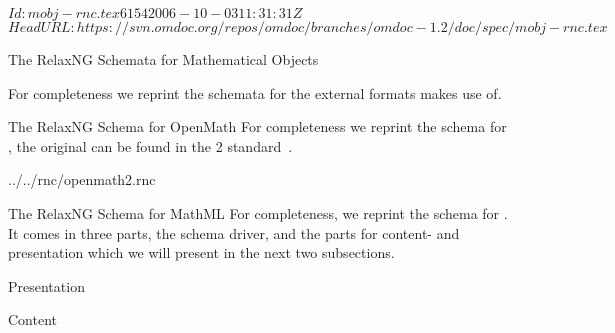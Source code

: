 \svnInfo $Id: mobj-rnc.tex 6154 2006-10-03 11:31:31Z  $
\svnKeyword $HeadURL: https://svn.omdoc.org/repos/omdoc/branches/omdoc-1.2/doc/spec/mobj-rnc.tex $

\begin{tchapter}[id=mobj-rnc]{The RelaxNG Schemata for Mathematical Objects}

For completeness we reprint the {\relaxng} schemata for the external formats
{\omdoc} makes use of.
\begin{tsection}[id=rnc:openmath]{The RelaxNG Schema for OpenMath}
  For completeness we reprint the {\relaxng} schema for {\openmath}, the original
  can be found in the {\openmath}2 standard~\cite{BusCapCar:2oms04}.
  
  {../../rnc/openmath2.rnc}
\end{tsection}

\begin{tsection}[id=rnc:mathml]{The RelaxNG Schema for MathML}
  For completeness, we reprint the {\relaxng} schema for {\mathml}. It comes in three
  parts, the schema driver, and the parts for content- and presentation {\mathml} which we
  will present in the next two subsections.
  

\begin{tsubsection}[id=rnc:pmathml]{Presentation {\mathml}}
  
\end{tsubsection}

\begin{tsubsection}[id=rnc:cmathml]{Content {\mathml}}
  
\end{tsubsection}
\end{tsection}
\end{tchapter}



